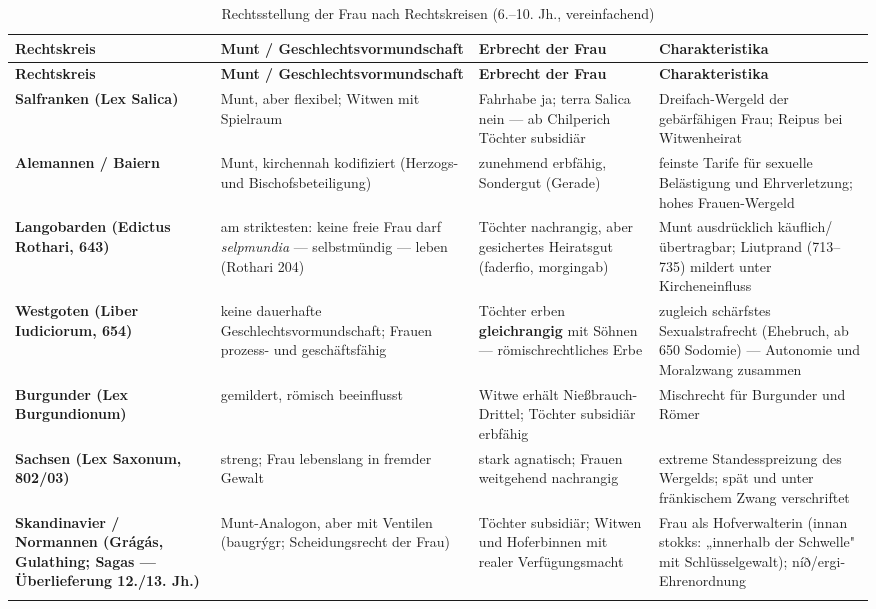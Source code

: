 \documentclass[11pt,a4paper,ngerman]{scrartcl}
\begin{document}
\begin{small}
\begin{longtable}{>{\raggedright\arraybackslash}p{}>{\raggedright\arraybackslash}p{}>{\raggedright\arraybackslash}p{}>{\raggedright\arraybackslash}p{}}
\caption{Rechtsstellung der Frau nach Rechtskreisen (6.–10. Jh., vereinfachend)}\\
\toprule
\textbf{Rechtskreis} & \textbf{Munt / Geschlechtsvormundschaft} & \textbf{Erbrecht der Frau} & \textbf{Charakteristika} \\
\midrule
\endfirsthead
\toprule
\textbf{Rechtskreis} & \textbf{Munt / Geschlechtsvormundschaft} & \textbf{Erbrecht der Frau} & \textbf{Charakteristika} \\
\midrule
\endhead
\textbf{Salfranken (Lex Salica)} & Munt, aber flexibel; Witwen mit Spielraum & Fahrhabe ja; terra Salica nein — ab Chilperich Töchter subsidiär & Dreifach-Wergeld der gebärfähigen Frau; Reipus bei Witwenheirat \\
\addlinespace[2pt]
\textbf{Alemannen / Baiern} & Munt, kirchennah kodifiziert (Herzogs- und Bischofsbeteiligung) & zunehmend erbfähig, Sondergut (Gerade) & feinste Tarife für sexuelle Belästigung und Ehrverletzung; hohes Frauen-Wergeld \\
\addlinespace[2pt]
\textbf{Langobarden (Edictus Rothari, 643)} & am striktesten: keine freie Frau darf \emph{selpmundia} — selbstmündig — leben (Rothari 204) & Töchter nachrangig, aber gesichertes Heiratsgut (faderfio, morgingab) & Munt ausdrücklich käuflich/übertragbar; Liutprand (713–735) mildert unter Kircheneinfluss \\
\addlinespace[2pt]
\textbf{Westgoten (Liber Iudiciorum, 654)} & keine dauerhafte Geschlechtsvormundschaft; Frauen prozess- und geschäftsfähig & Töchter erben \textbf{gleichrangig} mit Söhnen — römischrechtliches Erbe & zugleich schärfstes Sexualstrafrecht (Ehebruch, ab 650 Sodomie) — Autonomie und Moralzwang zusammen \\
\addlinespace[2pt]
\textbf{Burgunder (Lex Burgundionum)} & gemildert, römisch beeinflusst & Witwe erhält Nießbrauch-Drittel; Töchter subsidiär erbfähig & Mischrecht für Burgunder und Römer \\
\addlinespace[2pt]
\textbf{Sachsen (Lex Saxonum, 802/03)} & streng; Frau lebenslang in fremder Gewalt & stark agnatisch; Frauen weitgehend nachrangig & extreme Standesspreizung des Wergelds; spät und unter fränkischem Zwang verschriftet \\
\addlinespace[2pt]
\textbf{Skandinavier / Normannen (Grágás, Gulathing; Sagas — Überlieferung 12./13. Jh.)} & Munt-Analogon, aber mit Ventilen (baugrýgr; Scheidungsrecht der Frau) & Töchter subsidiär; Witwen und Hoferbinnen mit realer Verfügungsmacht & Frau als Hofverwalterin (innan stokks: „innerhalb der Schwelle" mit Schlüsselgewalt); níð/ergi-Ehrenordnung \\
\addlinespace[2pt]
\bottomrule
\end{longtable}
\end{small}
\end{document}
